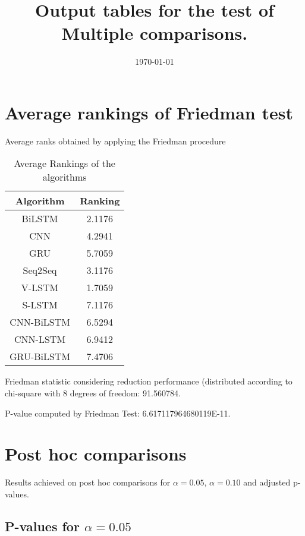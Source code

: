 \documentclass[a4paper,10pt]{article}
\title{Output tables for the test of Multiple comparisons.}
\author{}
\date{\today}
\begin{document}
\begin{landscape}
\pagestyle{empty}
\maketitle
\thispagestyle{empty}
\section{Average rankings of Friedman test}



Average ranks obtained by applying the Friedman procedure

\begin{table}[!htp]
\centering
\begin{tabular}{|c|c|}\hline
Algorithm&Ranking\\\hline
BiLSTM & 2.1176\\
CNN & 4.2941\\
GRU & 5.7059\\
Seq2Seq & 3.1176\\
V-LSTM & 1.7059\\
S-LSTM & 7.1176\\
CNN-BiLSTM & 6.5294\\
CNN-LSTM & 6.9412\\
GRU-BiLSTM & 7.4706\\
\hline
\end{tabular}
\caption{Average Rankings of the algorithms}
\end{table}

Friedman statistic considering reduction performance (distributed according to chi-square with 8 degrees of freedom: 91.560784.

P-value computed by Friedman Test: 6.617117964680119E-11.\newline



\pagebreak

\section{Post hoc comparisons}

Results achieved on post hoc comparisons for $\alpha = 0.05$, $\alpha = 0.10$ and adjusted p-values.

\subsection{P-values for $\alpha=0.05$}


\end{landscape}
\end{document}
